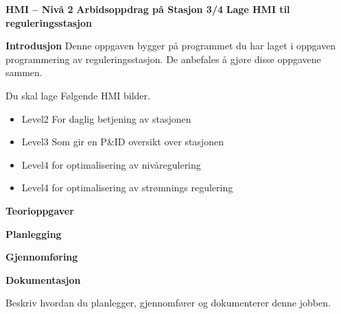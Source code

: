 

\noindent

\vskip 5pt






\vskip 5pt
\begin{center}
\textbf{HMI -- Nivå 2 }
\vskip 5pt 
\textbf{Arbidsoppdrag på Stasjon 3/4}
\vskip 5pt 
\textbf{Lage HMI til reguleringsstasjon}
\end{center}

\vskip 10pt 
\textbf{Introdusjon}
Denne oppgaven bygger på programmet du har laget i oppgaven programmering av reguleringsstasjon. De anbefales å gjøre disse oppgavene sammen. 



\vskip 5pt 
Du skal lage Følgende HMI bilder.
\begin{itemize}[noitemsep]
\item Level2 For daglig betjening av stasjonen
\item Level3 Som gir en P\&ID oversikt over stasjonen
\item Level4 for optimalisering av nivåregulering
\item Level4 for optimalisering av strømnings regulering
\end{itemize}

 
\vskip 5pt 


\vskip 10pt 
\textbf{Teorioppgaver}

\vskip 5pt 

\vskip 10pt 
\textbf{Planlegging}


\vskip 10pt 
\textbf{Gjennomføring}

\vskip 10pt 
\textbf{Dokumentasjon}

Beskriv hvordan du planlegger, gjennomfører og dokumenterer denne jobben. 


















\vfil \eject

















